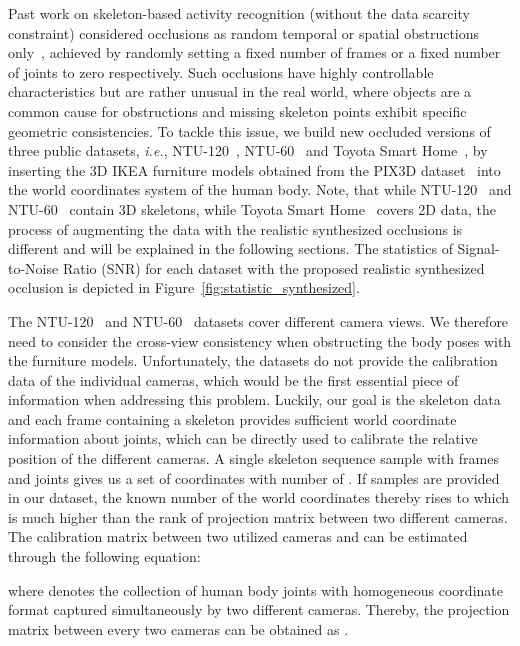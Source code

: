 \documentclass[lettersize,journal]{IEEEtran}
\begin{document}
Past work on skeleton-based activity recognition (without the data scarcity constraint) considered occlusions as random temporal or spatial obstructions only~\cite{song2019richly}, achieved by randomly setting a fixed number of frames or a fixed number of joints to zero respectively.
Such occlusions have highly controllable characteristics but are rather unusual in the real world, where objects are a common cause for obstructions and missing skeleton points exhibit specific geometric consistencies.
To tackle this issue, we build new occluded versions of three public datasets, \textit{i.e.}, NTU-120~\cite{liu2019ntu}, NTU-60~\cite{shahroudy2016ntu} and Toyota Smart Home~\cite{Das_2019_ICCV}, by inserting the 3D IKEA furniture models obtained from the PIX3D dataset~\cite{sun2018pix3d} into the world coordinates system of the human body.
Note, that while NTU-120~\cite{liu2019ntu} and NTU-60~\cite{shahroudy2016ntu} contain 3D skeletons, while Toyota Smart Home~\cite{Das_2019_ICCV} covers 2D data, the process of augmenting the data with the realistic synthesized occlusions is different and will be explained in the following sections.
The statistics of Signal-to-Noise Ratio (SNR) for each dataset with the proposed realistic synthesized occlusion is depicted in Figure~\ref{fig:statistic_synthesized}.

The NTU-120~\cite{liu2019ntu} and NTU-60~\cite{shahroudy2016ntu} datasets cover different camera views.
We therefore need to consider the cross-view consistency when obstructing the body poses with the furniture models. 
Unfortunately, the datasets do not provide the calibration data of the individual cameras, which would be the first essential piece of information when addressing this problem.
Luckily, our goal is the skeleton data and each frame containing a skeleton provides sufficient world coordinate information about joints, which can be directly used to calibrate the relative position of the different cameras.
A single skeleton sequence sample with  frames and  joints gives us a set of coordinates with number of .
If  samples are provided in our dataset, the known number of the world coordinates thereby rises to  which is much higher than the rank of projection matrix between two different cameras. 
The calibration matrix  between two utilized cameras  and  can be estimated through the following equation:

where  denotes the collection of human body joints with homogeneous coordinate format captured simultaneously by two different cameras. 
Thereby, the projection matrix between every two cameras can be obtained as . 
\end{document}
